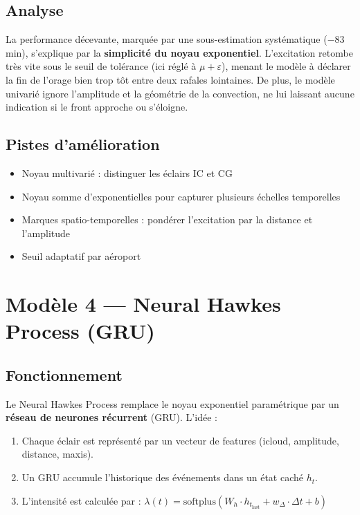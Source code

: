 \documentclass[11pt,a4paper]{article}
\begin{document}
\subsection{Analyse}
La performance décevante, marquée par une sous-estimation systématique ($-83$ min), 
s'explique par la \textbf{simplicité du noyau exponentiel}. L'excitation retombe très vite 
sous le seuil de tolérance (ici réglé à $\mu + \varepsilon$), menant le modèle à déclarer la 
fin de l'orage bien trop tôt entre deux rafales lointaines. De plus, le modèle univarié 
ignore l'amplitude et la géométrie de la convection, ne lui laissant aucune indication 
si le front approche ou s'éloigne.

\subsection{Pistes d'amélioration}
\begin{itemize}[noitemsep]
  \item Noyau multivarié : distinguer les éclairs IC et CG
  \item Noyau somme d'exponentielles pour capturer plusieurs échelles temporelles
  \item Marques spatio-temporelles : pondérer l'excitation par la distance et l'amplitude
  \item Seuil adaptatif par aéroport
\end{itemize}

\newpage
\section{Modèle 4 — Neural Hawkes Process (GRU)}

\subsection{Fonctionnement}
Le Neural Hawkes Process remplace le noyau exponentiel paramétrique par un 
\textbf{réseau de neurones récurrent} (GRU). L'idée :
\begin{enumerate}[noitemsep]
  \item Chaque éclair est représenté par un vecteur de features (icloud, amplitude, distance, maxis).
  \item Un GRU accumule l'historique des événements dans un état caché $h_t$.
  \item L'intensité est calculée par : $\lambda(t) = \text{softplus}(W_h \cdot h_{t_{\text{last}}} + w_\Delta \cdot \Delta t + b)$
\end{enumerate}
\end{document}
